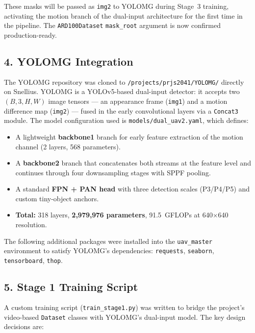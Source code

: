 \noindent These masks will be passed as \texttt{img2} to YOLOMG
during Stage~3 training, activating the motion branch of the
dual-input architecture for the first time in the pipeline.
The \texttt{ARD100Dataset} \texttt{mask\_root} argument is now
confirmed production-ready.

\subsection*{4. YOLOMG Integration}

The YOLOMG repository \cite{guo_yolomg_2025} was cloned to
\texttt{/projects/prjs2041/YOLOMG/} directly on Snellius. YOLOMG is
a YOLOv5-based dual-input detector: it accepts two $(B,3,H,W)$ image
tensors — an appearance frame (\texttt{img1}) and a motion difference
map (\texttt{img2}) — fused in the early convolutional layers via a
\texttt{Concat3} module. The model configuration used is
\texttt{models/dual\_uav2.yaml}, which defines:

\begin{itemize}
    \item A lightweight \textbf{backbone1} branch for early feature
          extraction of the motion channel (2 layers, 568 parameters).
    \item A \textbf{backbone2} branch that concatenates both streams
          at the feature level and continues through four
          downsampling stages with SPPF pooling.
    \item A standard \textbf{FPN + PAN head} with three detection
          scales (P3/P4/P5) and custom tiny-object anchors.
    \item \textbf{Total:} 318 layers, \textbf{2,979,976 parameters},
          91.5~GFLOPs at 640$\times$640 resolution.
\end{itemize}

\noindent The following additional packages were installed into the
\texttt{uav\_master} environment to satisfy YOLOMG's dependencies:
\texttt{requests}, \texttt{seaborn}, \texttt{tensorboard},
\texttt{thop}.

\subsection*{5. Stage 1 Training Script}

A custom training script (\texttt{train\_stage1.py}) was written to
bridge the project's video-based \texttt{Dataset} classes with
YOLOMG's dual-input model. The key design decisions are:

